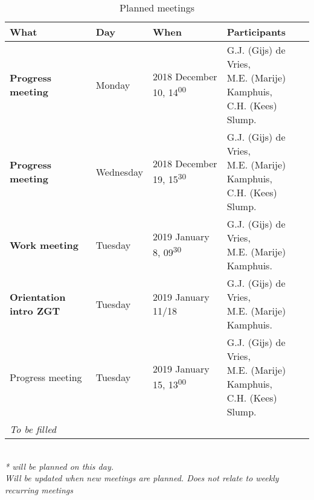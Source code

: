 \begin{table}[h!]
	\hspace*{-1.2cm}\begin{tabular}{p{29mm}|lll}
		\textbf{What} 		& 	Day	&	When	&	Participants \hfill \\
		\hline
		\textbf{Progress meeting} & Monday 		& 2018 December 10,	14\textsuperscript{00} &	 \makecell[l]{G.J. (Gijs) de Vries, \\M.E. (Marije) Kamphuis, \\C.H. (Kees) Slump.}\\
		\rowcolor{Gray}
		 \textbf{Progress meeting} & Wednesday 	& 2018 December 19,	15\textsuperscript{30} &	 \makecell[l]{G.J. (Gijs) de Vries, \\M.E. (Marije) Kamphuis, \\C.H. (Kees) Slump.}\\
		 \textbf{Work meeting} & Tuesday & 2019 January 8, 09\textsuperscript{30} & \makecell[l]{G.J. (Gijs) de Vries, \\M.E. (Marije) Kamphuis.} \\
		 \rowcolor{Gray}
		 \textbf{Orientation intro ZGT} \hfill & Tuesday & 2019 January 11/18 & \makecell[l]{G.J. (Gijs) de Vries, \\M.E. (Marije) Kamphuis.}\\
		Progress meeting & Tuesday & 2019 January 15, 13\textsuperscript{00}	& \makecell[l]{G.J. (Gijs) de Vries, \\ M.E. (Marije) Kamphuis, \\ C.H. (Kees) Slump.}\\	 
		 \rowcolor{Gray}
		  \textit{To be filled} & & & \\
		 \hline
	\end{tabular}\hspace*{-1.2cm} \\
	\textit{* will be planned on this day.}\\	
	\textit{Will be updated when new meetings are planned. Does not relate to weekly recurring meetings}
	\caption{Planned meetings}
	\label{tab:planned_meet}
\end{table}